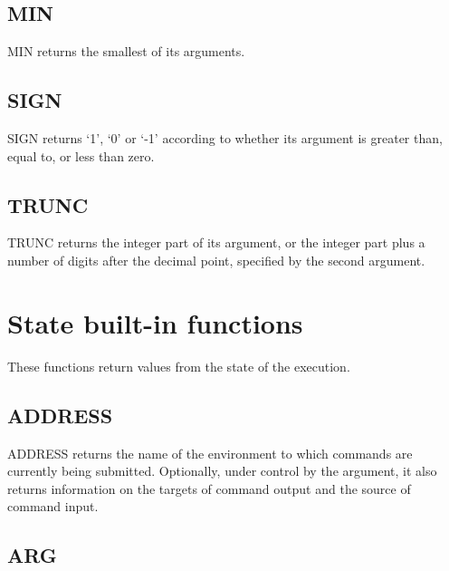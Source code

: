\subsection{MIN}\label{min}

MIN returns the smallest of its arguments.



\subsection{SIGN}\label{sign}

SIGN returns `1', `0' or `-1' according to whether its argument is
greater than, equal to, or less than zero.



\subsection{TRUNC}\label{trunc}

TRUNC returns the integer part of its argument, or the integer part plus
a number of digits after the decimal point, specified by the second
argument.



\section{State built-in functions}\label{state-built-in-functions}

These functions return values from the state of the execution.

\subsection{ADDRESS}\label{address}

ADDRESS returns the name of the environment to which commands are
currently being submitted. Optionally, under control by the argument, it
also returns information on the targets of command output and the source
of command input.



\subsection{ARG}\label{arg}

